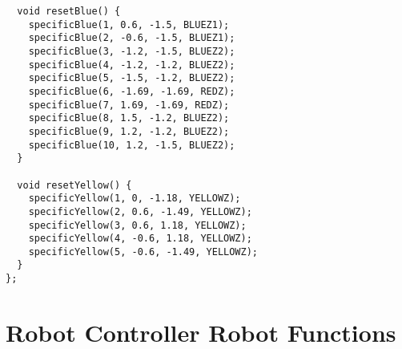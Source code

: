 \begin{verbatim}
  void resetBlue() {
    specificBlue(1, 0.6, -1.5, BLUEZ1);
    specificBlue(2, -0.6, -1.5, BLUEZ1);
    specificBlue(3, -1.2, -1.5, BLUEZ2);
    specificBlue(4, -1.2, -1.2, BLUEZ2);
    specificBlue(5, -1.5, -1.2, BLUEZ2);
    specificBlue(6, -1.69, -1.69, REDZ);
    specificBlue(7, 1.69, -1.69, REDZ);
    specificBlue(8, 1.5, -1.2, BLUEZ2);
    specificBlue(9, 1.2, -1.2, BLUEZ2);
    specificBlue(10, 1.2, -1.5, BLUEZ2);
  }
 
  void resetYellow() {
    specificYellow(1, 0, -1.18, YELLOWZ);
    specificYellow(2, 0.6, -1.49, YELLOWZ);
    specificYellow(3, 0.6, 1.18, YELLOWZ);
    specificYellow(4, -0.6, 1.18, YELLOWZ);
    specificYellow(5, -0.6, -1.49, YELLOWZ);
  }
};
\end{verbatim}
\section*{Robot Controller Robot Functions}
